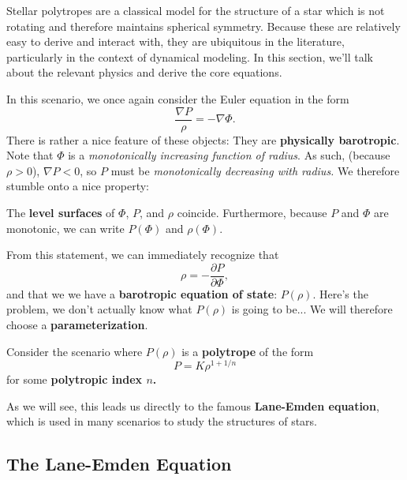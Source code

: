 Stellar polytropes are a classical model for the structure of a star which is not rotating and therefore maintains spherical symmetry. Because these are relatively easy to derive and interact with, they are ubiquitous in the literature, particularly in the context of dynamical modeling. In this section, we'll talk about the relevant physics and derive the core equations.
\par
In this scenario, we once again consider the Euler equation in the form
\[
\frac{\nabla P}{\rho} = -\nabla \Phi.
\]
There is rather a nice feature of these objects: They are \textbf{physically barotropic}. Note that $\Phi$ is a \textit{monotonically increasing function of radius}. As such, (because $\rho > 0$), $\nabla P < 0$, so $P$ must be \textit{monotonically decreasing with radius.} We therefore stumble onto a nice property:
\begin{center}
    The \textbf{level surfaces} of $\Phi$, $P$, and $\rho$ coincide. Furthermore, because $P$ and $\Phi$ are monotonic, we can write $P(\Phi)$ and $\rho(\Phi)$.
\end{center}
\par
From this statement, we can immediately recognize that
\[
\rho = - \frac{\partial P}{\partial \Phi},
\]
and that we we have a \textbf{barotropic equation of state}: $P(\rho)$. Here's the problem, we don't actually know what $P(\rho)$ is going to be... We will therefore choose a \textbf{parameterization}.
\vspace{0.5cm}
\begin{proposition}
    Consider the scenario where $P(\rho)$ is a \textbf{polytrope} of the form
    \[
    P = K \rho^{1+1/n}
    \]
    for some \textbf{polytropic index $n$.}
\end{proposition}
\vspace{0.5cm}
As we will see, this leads us directly to the famous \textbf{Lane-Emden equation}, which is used in many scenarios to study the structures of stars.

\subsection{The Lane-Emden Equation}

